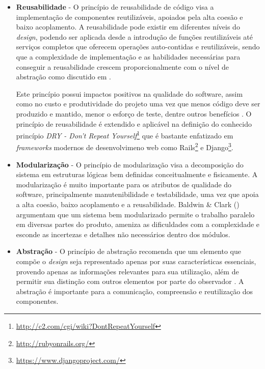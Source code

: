 \begin{itemize}

\item \textbf{Reusabilidade} - O princípio de reusabilidade de código visa a implementação de componentes reutilizáveis, apoiados pela alta coesão e baixo acoplamento.
%
A reusabilidade pode existir em diferentes níveis do \emph{design}, podendo ser aplicada desde a introdução de funções reutilizáveis até serviços completos que oferecem operações auto-contidas e reutilizáveis, sendo que a complexidade de implementação e as habilidades necessárias para conseguir a reusabilidade crescem proporcionalmente com o nível de abstração como discutido em \cite{cruise2007}.

Este princípio possui impactos positivos na qualidade do software, assim como no custo e produtividade do projeto uma vez que menos código deve ser produzido e mantido, menor o esforço de teste, dentre outros benefícios \cite{sametinger1997}.
%
O princípio de reusabilidade é extendido e aplicável na definição do conhecido princípio \emph{DRY - Don't Repeat Yourself}\footnote{\url{http://c2.com/cgi/wiki?DontRepeatYourself}} que é bastante enfatizado em \emph{frameworks} modernos de desenvolvimeno web como Rails\footnote{\url{http://rubyonrails.org/}} e Django\footnote{\url{https://www.djangoproject.com/}}.
%
\item \textbf{Modularização} - O princípio de modularização visa a decomposição do sistema em estruturas lógicas bem definidas conceitualmente e fisicamente.
%
A modularização é muito importante para os atributos de qualidade do software, principalmente manutenibilidade e testabilidade, uma vez que apoia a alta coesão, baixo acoplamento e a reusabilidade.
%
Baldwin \& Clark (\citeyear{baldwin2000}) argumentam que um sistema bem modularizado permite o trabalho paralelo em diversas partes do produto, ameniza as dificuldades com a complexidade e esconde as incertezas e detalhes não necessários dentro dos módulos.
%
\item \textbf{Abstração} - O princípio de abstração recomenda que um elemento que compõe o \emph{design} seja representado apenas por suas características essenciais, provendo apenas as informações relevantes  para sua utilização, além de permitir sua distinção com outros elementos por parte do observador \cite{germoglio2009}.
%
A abstração é importante para a comunicação, compreensão e reutilização dos componentes.


\end{itemize}
